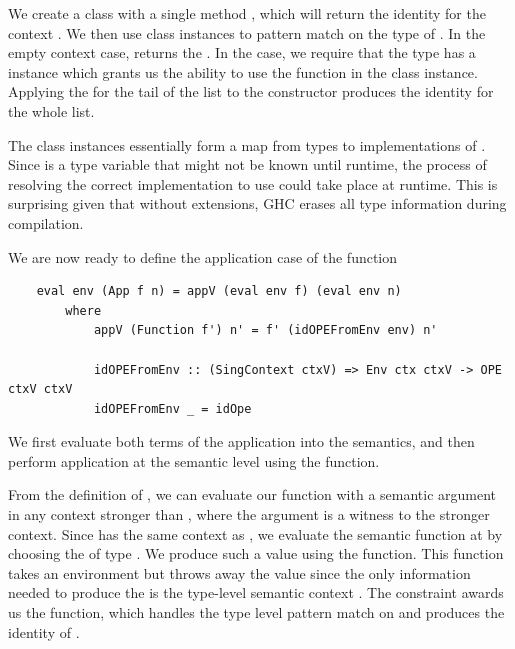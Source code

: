 We create a class  with a single method , which will return the identity  for the context . We then use class instances to pattern match on the type of . In the empty context case,  returns the  . In the  case, we require that the type  has a  instance which grants us the ability to use the  function in the class instance. Applying the  for the tail of the list to the  constructor produces the identity  for the whole list. 

The class instances essentially form a map from types to implementations of . Since  is a type variable that might not be known until runtime, the process of resolving the correct implementation to use could take place at runtime. This is surprising given that without extensions, GHC erases all type information during compilation. 




We are now ready to define the application case of the  function

\begin{lstlisting}
    eval env (App f n) = appV (eval env f) (eval env n) 
        where
            appV (Function f') n' = f' (idOPEFromEnv env) n'

            idOPEFromEnv :: (SingContext ctxV) => Env ctx ctxV -> OPE ctxV ctxV
            idOPEFromEnv _ = idOpe 
\end{lstlisting}

We first evaluate both terms of the application into the semantics, and then perform application at the semantic level using the  function. 

From the definition of , we can evaluate our function with a semantic argument in any context stronger than , where the  argument is a witness to the stronger context.
Since  has the same context  as , we evaluate the semantic function  at  by choosing the  of type . We produce such a value using the  function. This function takes an environment but throws away the value since the only information needed to produce the  is the type-level semantic context . The  constraint awards us the  function, which handles the type level pattern match on  and produces the identity  of . 

